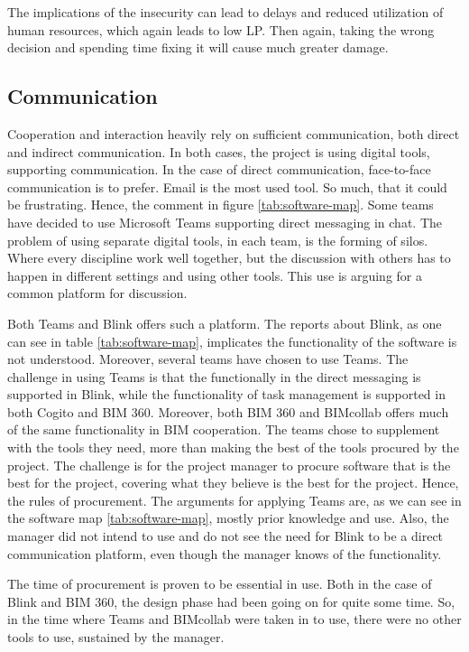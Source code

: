 The implications of the insecurity can lead to delays and reduced utilization of human resources, which again leads to low LP. Then again, taking the wrong decision and spending time fixing it will cause much greater damage. 

\subsection{Communication}
Cooperation and interaction heavily rely on sufficient communication, both direct and indirect communication. In both cases, the project is using digital tools, supporting communication. In the case of direct communication, face-to-face communication is to prefer. Email is the most used tool. So much, that it could be frustrating. Hence, the comment in figure \ref{tab:software-map}. Some teams have decided to use Microsoft Teams supporting direct messaging in chat. The problem of using separate digital tools, in each team, is the forming of silos. Where every discipline work well together, but the discussion with others has to happen in different settings and using other tools. This use is arguing for a common platform for discussion. 

Both Teams and Blink offers such a platform. The reports about Blink, as one can see in table \ref{tab:software-map}, implicates the functionality of the software is not understood. Moreover, several teams have chosen to use Teams. The challenge in using Teams is that the functionally in the direct messaging is supported in Blink, while the functionality of task management is supported in both Cogito and BIM 360. Moreover, both BIM 360 and BIMcollab offers much of the same functionality in BIM cooperation. The teams chose to supplement with the tools they need, more than making the best of the tools procured by the project. The challenge is for the project manager to procure software that is the best for the project, covering what they believe is the best for the project. Hence, the rules of procurement. The arguments for applying Teams are, as we can see in the software map \ref{tab:software-map}, mostly prior knowledge and use. Also, the manager did not intend to use and do not see the need for Blink to be a direct communication platform, even though the manager knows of the functionality. 

The time of procurement is proven to be essential in use. Both in the case of Blink and BIM 360, the design phase had been going on for quite some time. So, in the time where Teams and BIMcollab were taken in to use, there were no other tools to use, sustained by the manager.

